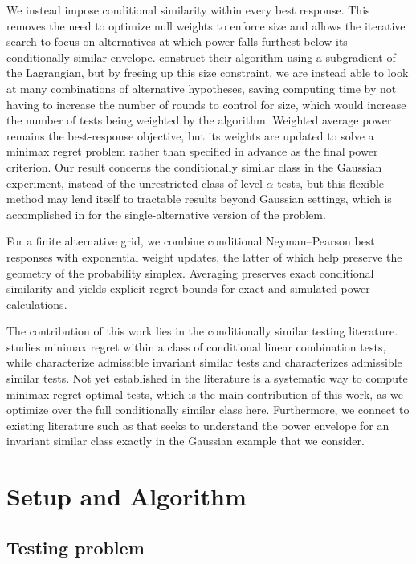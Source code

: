 \documentclass[11pt]{article}
\begin{document}
We instead impose conditional similarity within every best response. This removes the need to optimize null weights to enforce size and allows the iterative search to focus on alternatives at which power falls furthest below its conditionally similar envelope. \citet{aradillas2025approximate} construct their algorithm using a subgradient of the Lagrangian, but by freeing up this size constraint, we are instead able to look at many combinations of alternative hypotheses, saving computing time by not having to increase the number of rounds to control for size, which would increase the number of tests being weighted by the algorithm. Weighted average power remains the best-response objective, but its weights are updated to solve a minimax regret problem rather than specified in advance as the final power criterion. Our result concerns the conditionally similar class in the Gaussian experiment, instead of the unrestricted class of level-$\alpha$ tests, but this flexible method may lend itself to tractable results beyond Gaussian settings, which is accomplished in \cite{aradillas2025approximate} for the single-alternative version of the problem.

For a finite alternative grid, we combine conditional Neyman--Pearson best responses with exponential weight updates, the latter of which help preserve the geometry of the probability simplex. Averaging preserves exact conditional similarity and yields explicit regret bounds for exact and simulated power calculations.

The contribution of this work lies in the conditionally similar testing literature. \citet{andrews2016conditional} studies minimax regret within a class of conditional linear combination tests, while \citet{chernozhukov2009admissible} characterize admissible invariant similar tests and \citet{olea2020admissible} characterizes admissible similar tests. Not yet established in the literature is a systematic way to compute minimax regret optimal tests, which is the main contribution of this work, as we optimize over the full conditionally similar class here. Furthermore, we connect to existing literature such as \cite{andrews2006optimal} that seeks to understand the power envelope for an invariant similar class exactly in the Gaussian example that we consider.

\section{Setup and Algorithm}
\subsection{Testing problem}
\end{document}
